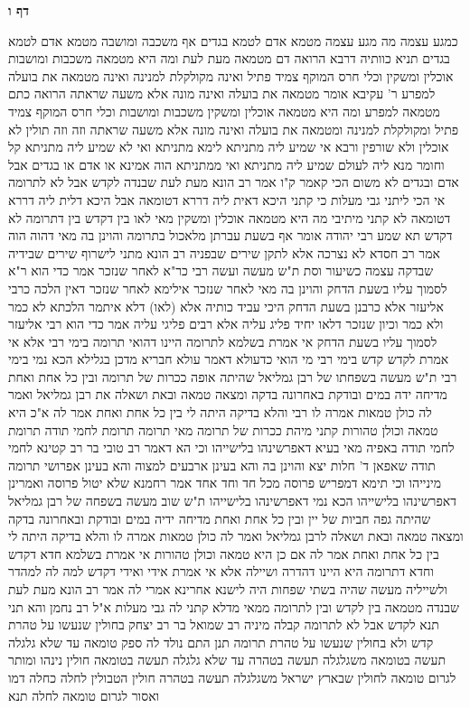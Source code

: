 \documentclass[12pt, openany]{book}
\newcommand{\sethebfont}{
\fontsize{10.5pt}{21.0pt} \selectfont
}
\newcommand{\twocol}[1]{
	{\sethebfont \begin{multicols}{2}
			#1
	\end{multicols}}	
}
\newcommand{\sectname}{}
\newcommand{\newsection}[1]{
	\addcontentsline{toc}{section}{#1}
	\renewcommand{\sectname}{#1}	
	\vspace{-\baselineskip}
	\begin{center}
		\textbf{%
\fontsize{16pt}{16pt}\selectfont
			#1}
	\end{center}
	\vspace{-\baselineskip}
	\nopagebreak
}
\begin{document}
\newsection{דף ו}
\twocol{כמגע עצמה מה מגע עצמה מטמא אדם לטמא בגדים אף משכבה ומושבה מטמא אדם לטמא בגדים 
תניא כוותיה דרבא  הרואה דם מטמאה מעת לעת  ומה היא מטמאה  משכבות ומושבות אוכלין ומשקין וכלי חרס המוקף צמיד פתיל ואינה מקולקלת למנינה ואינה מטמאה את בועלה למפרע  ר' עקיבא אומר  מטמאה את בועלה  ואינה מונה אלא משעה שראתה 
הרואה כתם מטמאה למפרע ומה היא מטמאה  אוכלין ומשקין משכבות ומושבות וכלי חרס המוקף צמיד פתיל ומקולקלת למנינה ומטמאה את בועלה ואינה מונה אלא משעה שראתה 
וזה וזה תולין לא אוכלין ולא שורפין 
ורבא אי שמיע ליה מתניתא לימא מתניתא  ואי לא שמיע ליה מתניתא קל וחומר מנא ליה 
לעולם שמיע ליה מתניתא ואי ממתניתא הוה אמינא  או אדם או בגדים אבל אדם ובגדים לא משום הכי קאמר ק"ו 
אמר רב הונא  מעת לעת שבנדה לקדש אבל לא לתרומה  אי הכי ליתני גבי מעלות  כי קתני היכא דאית ליה דררא דטומאה אבל היכא דלית ליה דררא דטומאה לא קתני 
מיתיבי  מה היא מטמאה אוכלין ומשקין  מאי לאו  בין דקדש בין דתרומה  לא דקדש 
תא שמע רבי יהודה אומר  אף בשעת עברתן מלאכול בתרומה  והוינן בה  מאי דהוה הוה 
אמר רב חסדא  לא נצרכה אלא לתקן שירים שבפניה 
רב הונא מתני  לישרוף שירים שבידיה  שבדקה עצמה כשיעור וסת 
ת"ש מעשה ועשה רבי כר"א
לאחר שנזכר אמר  כדי הוא ר"א לסמוך עליו
בשעת הדחק  והוינן בה  מאי לאחר שנזכר  אילימא לאחר שנזכר דאין הלכה כרבי אליעזר אלא כרבנן בשעת הדחק היכי עביד כותיה 
אלא (לאו) דלא איתמר הלכתא לא כמר ולא כמר וכיון שנזכר דלאו יחיד פליג עליה אלא רבים פליגי עליה אמר כדי הוא רבי אליעזר לסמוך עליו בשעת הדחק 
אי אמרת בשלמא לתרומה היינו דהואי תרומה בימי רבי אלא אי אמרת לקדש קדש בימי רבי מי הואי 
כדעולא דאמר עולא  חבריא מדכן בגלילא הכא נמי בימי רבי 
ת"ש  מעשה בשפחתו של רבן גמליאל שהיתה אופה ככרות של תרומה ובין כל אחת ואחת מדיחה ידה במים ובודקת  באחרונה בדקה ומצאה טמאה ובאת ושאלה את רבן גמליאל ואמר לה כולן טמאות אמרה לו  רבי והלא בדיקה היתה לי בין כל אחת ואחת  אמר לה  א"כ היא טמאה וכולן טהורות 
קתני מיהת ככרות של תרומה  מאי תרומה  תרומת לחמי תודה  תרומת לחמי תודה באפיה מאי בעיא 
דאפרשינהו בלישייהו  וכי הא דאמר רב טובי בר רב קטינא  לחמי תודה שאפאן ד' חלות יצא  והוינן בה  והא בעינן ארבעים  למצוה 
והא בעינן אפרושי תרומה מינייהו  וכי תימא דמפריש פרוסה מכל חד וחד אחד אמר רחמנא שלא יטול פרוסה  ואמרינן  דאפרשינהו בלישייהו הכא נמי דאפרשינהו בלישייהו 
ת"ש  שוב מעשה בשפחה של רבן גמליאל שהיתה גפה חביות של יין ובין כל אחת ואחת מדיחה ידיה במים ובודקת  ובאחרונה בדקה ומצאה טמאה ובאת ושאלה לרבן גמליאל ואמר לה  כולן טמאות  אמרה לו  והלא בדיקה היתה לי בין כל אחת ואחת  אמר לה אם כן היא טמאה וכולן טהורות 
אי אמרת בשלמא חדא דקדש וחדא דתרומה היא היינו דהדרה ושיילה אלא אי אמרת אידי ואידי דקדש למה לה למהדר ולשייליה  מעשה שהיה בשתי שפחות היה 
לישנא אחרינא אמרי לה  אמר רב הונא מעת לעת שבנדה מטמאה בין לקדש ובין לתרומה ממאי  מדלא קתני לה גבי מעלות  א"ל רב נחמן  והא תני תנא לקדש אבל לא לתרומה 
קבלה מיניה רב שמואל בר רב יצחק  בחולין שנעשו על טהרת קדש ולא בחולין שנעשו על טהרת תרומה 
תנן התם  נולד לה ספק טומאה עד שלא גלגלה תעשה בטומאה משגלגלה תעשה בטהרה 
עד שלא גלגלה תעשה בטומאה חולין נינהו ומותר לגרום טומאה לחולין שבארץ ישראל  משגלגלה תעשה בטהרה חולין הטבולין לחלה כחלה דמו ואסור לגרום טומאה לחלה 
תנא}
\end{document}
